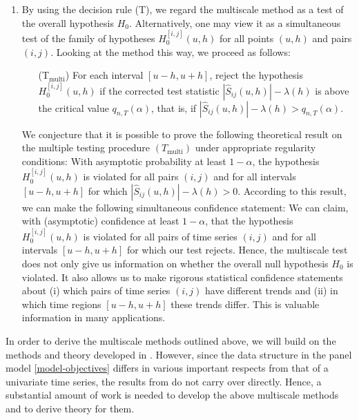 \documentclass[a4paper,12pt]{article}
\begin{document}
\begin{enumerate}[label=(\roman*),leftmargin=0.75cm]
\item By using the decision rule (T), we regard the multiscale method as a test of the overall hypothesis $H_0$. Alternatively, one may view it as a simultaneous test of the family of hypotheses $H_0^{[i,j]}(u,h)$ for all points $(u,h)$ and pairs $(i,j)$. Looking at the method this way, we proceed as follows: 
\begin{itemize}[leftmargin=1.5cm]
\item[(T$_\text{multi}$)] 
For each interval $[u-h,u+h]$, reject the hypothesis $H_0^{[i,j]}(u,h)$ if the corrected test statistic $|\hat{S}_{ij}(u,h)| - \lambda(h)$ is above the critical value $q_{n,T}(\alpha)$, that is, if $|\hat{S}_{ij}(u,h)| - \lambda(h) > q_{n,T}(\alpha)$. 
\end{itemize}
We conjecture that it is possible to prove the following theoretical result on the multiple testing procedure $(T_{\text{multi}})$ under appropriate regularity conditions: With asymptotic probability at least $1-\alpha$, the hypothesis $H_0^{[i,j]}(u,h)$ is violated for all pairs $(i,j)$ and for all intervals $[u-h,u+h]$ for which $|\hat{S}_{ij}(u,h)| - \lambda(h) > 0$. According to this result, we can make the following simultaneous confidence statement: We can claim, with (asymptotic) confidence at least $1-\alpha$, that the hypothesis $H_0^{[i,j]}(u,h)$ is violated for all pairs of time series $(i,j)$ and for all intervals $[u-h,u+h]$ for which our test rejects. Hence, the multiscale test does not only give us information on whether the overall null hypothesis $H_0$ is violated. It also allows us to make rigorous statistical confidence statements about (i) which pairs of time series $(i,j)$ have different trends and (ii) in which time regions $[u-h,u+h]$ these trends differ. This is valuable information in many applications. 

\end{enumerate}
In order to derive the multiscale methods outlined above, we will build on the methods and theory developed in \cite{KhismatullinaVogt2018}. However, since the data structure in the panel model \eqref{model-objectives} differs in various important respects from that of a univariate time series, the results from \cite{KhismatullinaVogt2018} do not carry over directly. Hence, a substantial amount of work is needed to develop the above multiscale methods and to derive theory for them. 
\end{document}
